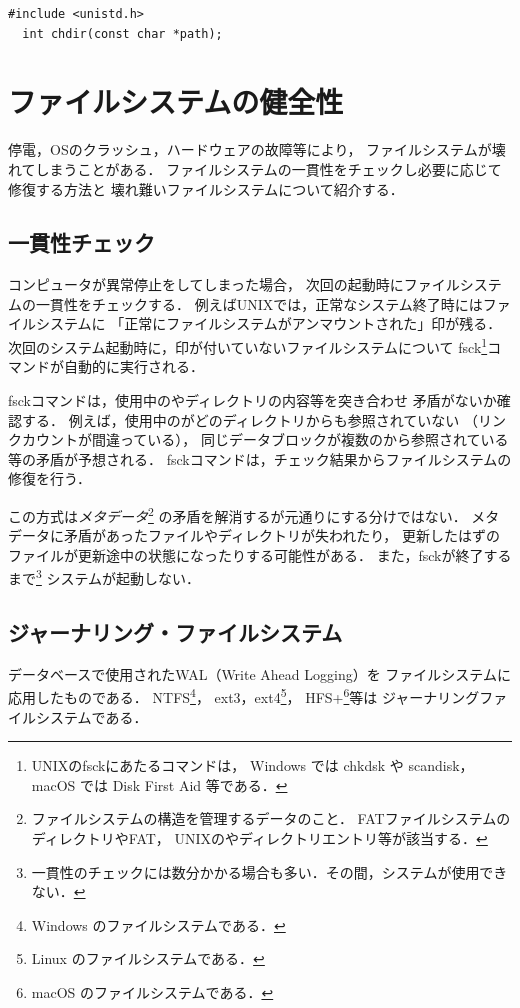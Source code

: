 \begin{lstlisting}[numbers=none]
  #include <unistd.h>
  int chdir(const char *path);
\end{lstlisting}

\section{ファイルシステムの健全性}
停電，OSのクラッシュ，ハードウェアの故障等により，
ファイルシステムが壊れてしまうことがある．
ファイルシステムの一貫性をチェックし必要に応じて修復する方法と
壊れ難いファイルシステムについて紹介する．

\subsection{一貫性チェック}
\label{unmountFlag}
コンピュータが異常停止をしてしまった場合，
次回の起動時にファイルシステムの一貫性をチェックする．
例えばUNIXでは，正常なシステム終了時にはファイルシステムに
「正常にファイルシステムがアンマウントされた」印が残る．
次回のシステム起動時に，印が付いていないファイルシステムについて
fsck\footnote{
  UNIXのfsckにあたるコマンドは，
  Windows では chkdsk や scandisk，macOS では Disk First Aid 等である．
}コマンドが自動的に実行される．

fsckコマンドは，使用中の\inode やディレクトリの内容等を突き合わせ
矛盾がないか確認する．
例えば，使用中の\inode がどのディレクトリからも参照されていない
（リンクカウントが間違っている），
同じデータブロックが複数の\inode から参照されている等の矛盾が予想される．
fsckコマンドは，チェック結果からファイルシステムの修復を行う．

この方式は\emph{メタデータ}\footnote{
  ファイルシステムの構造を管理するデータのこと．
  FATファイルシステムのディレクトリやFAT，
  UNIXの\inode やディレクトリエントリ等が該当する．}
の矛盾を解消するが元通りにする分けではない．
メタデータに矛盾があったファイルやディレクトリが失われたり，
更新したはずのファイルが更新途中の状態になったりする可能性がある．
また，fsckが終了するまで\footnote{
  一貫性のチェックには数分かかる場合も多い．その間，システムが使用できない．}
システムが起動しない．

\subsection{ジャーナリング・ファイルシステム}
データベースで使用されたWAL（Write Ahead Logging）を
ファイルシステムに応用したものである．
NTFS\footnote{Windows のファイルシステムである．}，
ext3，ext4\footnote{Linux のファイルシステムである．}，
HFS+\footnote{macOS のファイルシステムである．}等は
ジャーナリングファイルシステムである．

